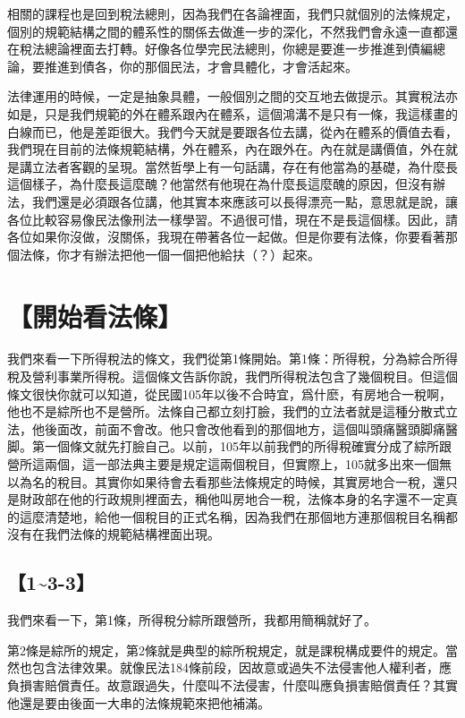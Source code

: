 \documentclass[]{ctexbook}
\begin{document}
相關的課程也是回到稅法總則，因為我們在各論裡面，我們只就個別的法條規定，個別的規範結構之間的體系性的關係去做進一步的深化，不然我們會永遠一直都還在稅法總論裡面去打轉。好像各位學完民法總則，你總是要進一步推進到債編總論，要推進到債各，你的那個民法，才會具體化，才會活起來。

法律運用的時候，一定是抽象具體，一般個別之間的交互地去做提示。其實稅法亦如是，只是我們規範的外在體系跟內在體系，這個鴻溝不是只有一條，我這樣畫的白線而已，他是差距很大。我們今天就是要跟各位去講，從內在體系的價值去看，我們現在目前的法條規範結構，外在體系，內在跟外在。內在就是講價值，外在就是講立法者客觀的呈現。當然哲學上有一句話講，存在有他當為的基礎，為什麼長這個樣子，為什麼長這麼醜？他當然有他現在為什麼長這麼醜的原因，但沒有辦法，我們還是必須跟各位講，他其實本來應該可以長得漂亮一點，意思就是說，讓各位比較容易像民法像刑法一樣學習。不過很可惜，現在不是長這個樣。因此，請各位如果你沒做，沒關係，我現在帶著各位一起做。但是你要有法條，你要看著那個法條，你才有辦法把他一個一個把他給扶（？）起來。

\hypertarget{ux958bux59cbux770bux6cd5ux689d}{%
\section{【開始看法條】}\label{ux958bux59cbux770bux6cd5ux689d}}

我們來看一下所得稅法的條文，我們從第1條開始。第1條：所得稅，分為綜合所得稅及營利事業所得稅。這個條文告訴你說，我們所得稅法包含了幾個稅目。但這個條文很快你就可以知道，從民國105年以後不合時宜，爲什麽，有房地合一稅啊，他也不是綜所也不是營所。法條自己都立刻打臉，我們的立法者就是這種分散式立法，他後面改，前面不會改。他只會改他看到的那個地方，這個叫頭痛醫頭脚痛醫脚。第一個條文就先打臉自己。以前，105年以前我們的所得稅確實分成了綜所跟營所這兩個，這一部法典主要是規定這兩個稅目，但實際上，105就多出來一個無以為名的稅目。其實你如果待會去看那些法條規定的時候，其實房地合一稅，還只是財政部在他的行政規則裡面去，稱他叫房地合一稅，法條本身的名字還不一定真的這麼清楚地，給他一個稅目的正式名稱，因為我們在那個地方連那個稅目名稱都沒有在我們法條的規範結構裡面出現。

\hypertarget{section-3}{%
\subsection{【1\textasciitilde3-3】}\label{section-3}}

我們來看一下，第1條，所得稅分綜所跟營所，我都用簡稱就好了。

第2條是綜所的規定，第2條就是典型的綜所稅規定，就是課稅構成要件的規定。當然也包含法律效果。就像民法184條前段，因故意或過失不法侵害他人權利者，應負損害賠償責任。故意跟過失，什麼叫不法侵害，什麼叫應負損害賠償責任？其實他還是要由後面一大串的法條規範來把他補滿。
\end{document}
